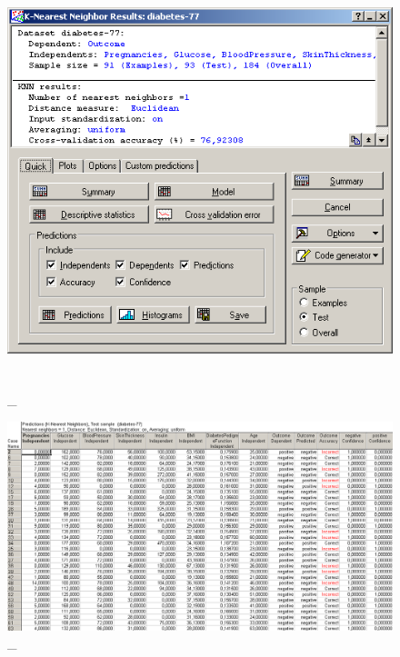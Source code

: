 \begin{figure}[!h]
  \centering

  \includegraphics[height=12cm]
  {inc/v5_19.PNG}

  \caption{\_}

  \label{fig:16}
\end{figure}

\begin{figure}[!hp]
  \centering

  \includegraphics[width=18cm]
  {inc/v5_20.PNG}

  \caption{\_}

  \label{fig:17}
\end{figure}

